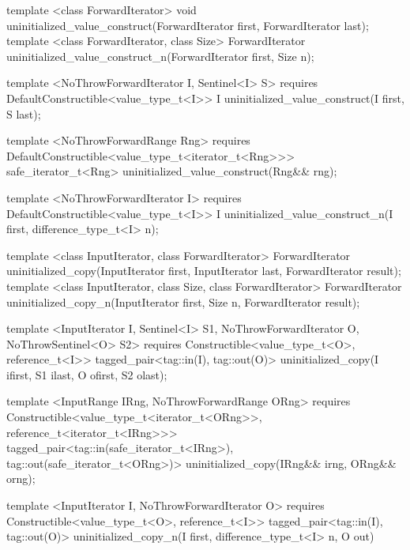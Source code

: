 {\color{remclr}
\begin{codeblock}
template <class ForwardIterator>
  void uninitialized_value_construct(ForwardIterator first, ForwardIterator last);
template <class ForwardIterator, class Size>
  ForwardIterator uninitialized_value_construct_n(ForwardIterator first, Size n);
\end{codeblock}
} %
{\color{addclr}
\begin{codeblock}
template <NoThrowForwardIterator I, Sentinel<I> S>
  requires
DefaultConstructible<value_type_t<I>>
  I uninitialized_value_construct(I first, S last);

template <NoThrowForwardRange Rng>
  requires
DefaultConstructible<value_type_t<iterator_t<Rng>>>
  safe_iterator_t<Rng> uninitialized_value_construct(Rng&& rng);

template <NoThrowForwardIterator I>
  requires
DefaultConstructible<value_type_t<I>>
  I uninitialized_value_construct_n(I first, difference_type_t<I> n);
\end{codeblock}
} %

{\color{remclr}
\begin{codeblock}
template <class InputIterator, class ForwardIterator>
  ForwardIterator uninitialized_copy(InputIterator first, InputIterator last,
                                     ForwardIterator result);
template <class InputIterator, class Size, class ForwardIterator>
  ForwardIterator uninitialized_copy_n(InputIterator first, Size n,
                                       ForwardIterator result);
\end{codeblock}
} %
{\color{addclr}
\begin{codeblock}
template <InputIterator I, Sentinel<I> S1, NoThrowForwardIterator O, NoThrowSentinel<O> S2>
  requires
Constructible<value_type_t<O>, reference_t<I>>
  tagged_pair<tag::in(I), tag::out(O)>
uninitialized_copy(I ifirst, S1 ilast, O ofirst, S2 olast);

template <InputRange IRng, NoThrowForwardRange ORng>
  requires
Constructible<value_type_t<iterator_t<ORng>>, reference_t<iterator_t<IRng>>>
  tagged_pair<tag::in(safe_iterator_t<IRng>), tag::out(safe_iterator_t<ORng>)>
uninitialized_copy(IRng&& irng, ORng&& orng);

template <InputIterator I, NoThrowForwardIterator O>
  requires
Constructible<value_type_t<O>, reference_t<I>>
  tagged_pair<tag::in(I), tag::out(O)>
uninitialized_copy_n(I first, difference_type_t<I> n, O out)
\end{codeblock}
} %


